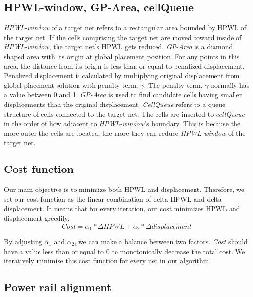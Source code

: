 \documentclass[sigconf,authordraft]{acmart}
\begin{document}
\subsection{HPWL-window, GP-Area, cellQueue}

\textit{HPWL-window} of a target net refers to a rectangular area bounded by HPWL of the target net. If the cells comprising the target net are moved toward inside of \textit{HPWL-window}, the target net’s HPWL gets reduced. \textit{GP-Area} is a diamond shaped area with its origin at global placement position. For any points in this area, the distance from its origin is less than or equal to penalized displacement. Penalized displacement is calculated by multiplying original displacement from global placement solution with penalty term, $\gamma$. The penalty term, $\gamma$ normally has a value between 0 and 1. \textit{GP-Area} is used to find candidate cells having smaller displacements than the original displacement. \textit{CellQueue} refers to a queue structure of cells connected to the target net. The cells are inserted to \textit{cellQueue} in the order of how adjacent to \textit{HPWL-window}’s boundary. This is because the more outer the cells are located, the more they can reduce \textit{HPWL-window} of the target net.




\subsection{Cost function}
Our main objective is to minimize both HPWL and displacement. Therefore, we set our cost function as the linear combination of delta HPWL and delta displacement. It means that for every iteration, our cost minimizes HPWL and displacement greedily.
\begin{equation} 
    Cost = \alpha_1 * \Delta HPWL + \alpha_2 * \Delta displacement
\end{equation}

By adjusting $\alpha_1$ and $\alpha_2$, we can make a balance between two factors. 
\textit{Cost} should have a value less than or equal to 0 to monotonically decrease the total cost. 
We iteratively minimize this cost function for every net in our algorithm. 

\subsection{Power rail alignment}
\end{document}
